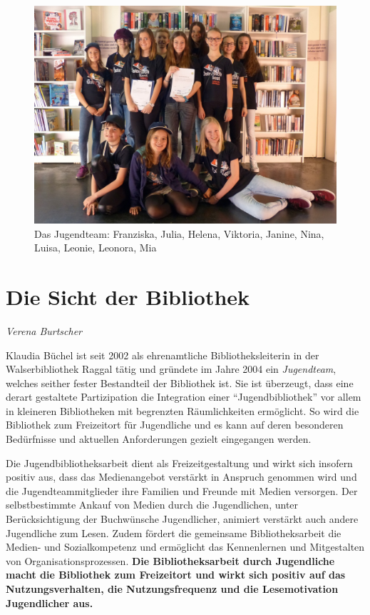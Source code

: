 \documentclass[a4paper,
fontsize=11pt,
oneside,
numbers=noperiodatend,
parskip=half-,
bibliography=totoc,
final
]{scrartcl}
\begin{document}
\begin{figure}
\centering
\includegraphics{image_1.jpg}
\caption{Das Jugendteam: Franziska, Julia, Helena, Viktoria, Janine,
Nina, Luisa, Leonie, Leonora, Mia}
\end{figure}

\newpage

\hypertarget{die-sicht-der-bibliothek}{%
\section*{Die Sicht der
Bibliothek}\label{die-sicht-der-bibliothek}}

\emph{Verena Burtscher}

Klaudia Büchel ist seit 2002 als ehrenamtliche Bibliotheksleiterin in
der Walserbibliothek Raggal tätig und gründete im Jahre 2004 ein
\emph{Jugendteam}, welches seither fester Bestandteil der Bibliothek
ist. Sie ist überzeugt, dass eine derart gestaltete Partizipation die
Integration einer \enquote{Jugendbibliothek} vor allem in kleineren
Bibliotheken mit begrenzten Räumlichkeiten ermöglicht. So wird die
Bibliothek zum Freizeitort für Jugendliche und es kann auf deren
besonderen Bedürfnisse und aktuellen Anforderungen gezielt eingegangen
werden.

Die Jugendbibliotheksarbeit dient als Freizeitgestaltung und wirkt sich
insofern positiv aus, dass das Medienangebot verstärkt in Anspruch
genommen wird und die Jugendteammitglieder ihre Familien und Freunde mit
Medien versorgen. Der selbstbestimmte Ankauf von Medien durch die
Jugendlichen, unter Berücksichtigung der Buchwünsche Jugendlicher,
animiert verstärkt auch andere Jugendliche zum Lesen. Zudem fördert die
gemeinsame Bibliotheksarbeit die Medien- und Sozialkompetenz und
ermöglicht das Kennenlernen und Mitgestalten von Organisationsprozessen.
\textbf{Die Bibliotheksarbeit durch Jugendliche macht die Bibliothek zum
Freizeitort und wirkt sich positiv auf das Nutzungsverhalten, die
Nutzungsfrequenz und die Lesemotivation Jugendlicher aus.}
\end{document}
